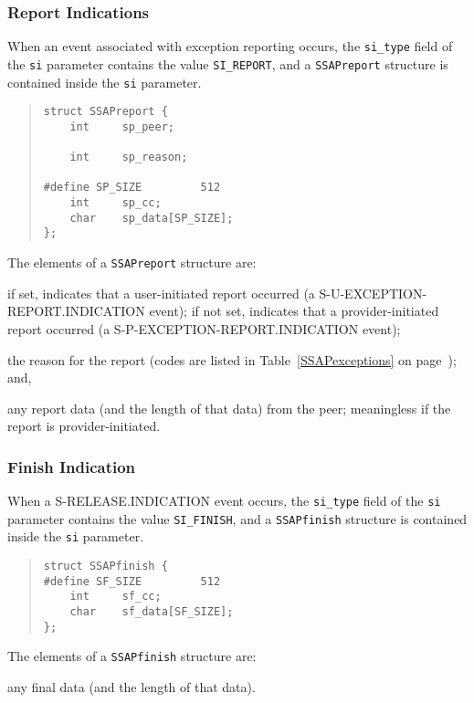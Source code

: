 \subsubsection	{Report Indications}
When an event associated with exception reporting occurs,
the \verb"si_type" field of the \verb"si" parameter contains the value
\verb"SI_REPORT",
and a \verb"SSAPreport" structure is contained inside the \verb"si"
parameter.
\begin{quote}\small\begin{verbatim}
struct SSAPreport {
    int     sp_peer;

    int     sp_reason;

#define SP_SIZE         512
    int     sp_cc;
    char    sp_data[SP_SIZE];
};
\end{verbatim}\end{quote}
The elements of a \verb"SSAPreport" structure are:
\begin{describe}
\item[\verb"sp\_peer":] if set, indicates that a user-initiated
report occurred (a {\sf S-U-EXCEPTION-REPORT.INDICATION\/} event);
if not set,
indicates that a provider-initiated report occurred
(a {\sf S-P-EXCEPTION-REPORT.INDICATION\/} event);

\item[\verb"sp\_reason":] the reason for the report
(codes are listed in Table~\ref{SSAPexceptions} on
page~\pageref{SSAPexceptions});
and,

\item[\verb"sp\_data"/\verb"sp\_cc":] any report data
(and the length of that data) from the peer;
meaningless if the report is provider-initiated.
\end{describe}

\subsubsection	{Finish Indication}
When a {\sf S-RELEASE.INDICATION\/} event occurs,
the \verb"si_type" field of the \verb"si" parameter contains the value
\verb"SI_FINISH",
and a \verb"SSAPfinish" structure is contained inside the \verb"si" parameter.
\begin{quote}\small\begin{verbatim}
struct SSAPfinish {
#define SF_SIZE         512
    int     sf_cc;
    char    sf_data[SF_SIZE];
};
\end{verbatim}\end{quote}
The elements of a \verb"SSAPfinish" structure are:
\begin{describe}
\item[\verb"sf\_data"/\verb"sf\_cc":] any final data (and the length of that
data).
\end{describe}

